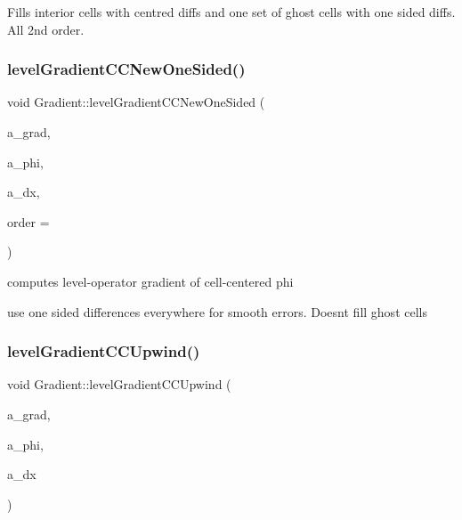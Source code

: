 Fills interior cells with centred diffs and one set of ghost cells with one sided diffs. All 2nd order. \mbox{\label{class_gradient_a00daa2aa0e66c5f70545cbd9cdf633a2}} 
\subsubsection{\texorpdfstring{level\+Gradient\+C\+C\+New\+One\+Sided()}{levelGradientCCNewOneSided()}}
{\footnotesize\ttfamily void Gradient\+::level\+Gradient\+C\+C\+New\+One\+Sided (\begin{DoxyParamCaption}\item[{\textbf{ Level\+Data}$<$ \textbf{ F\+Array\+Box} $>$ \&}]{a\+\_\+grad,  }\item[{const \textbf{ Level\+Data}$<$ \textbf{ F\+Array\+Box} $>$ \&}]{a\+\_\+phi,  }\item[{const \textbf{ Real}}]{a\+\_\+dx,  }\item[{int}]{order = {} }\end{DoxyParamCaption})\hspace{0.3cm}{\ttfamily [static]}}



computes level-\/operator gradient of cell-\/centered phi 

use one sided differences everywhere for smooth errors. Doesn\textquotesingle{}t fill ghost cells \mbox{\label{class_gradient_ab5fa9029705d216a3c1ae97b58bb970e}} 
\subsubsection{\texorpdfstring{level\+Gradient\+C\+C\+Upwind()}{levelGradientCCUpwind()}\hspace{0.1cm}{\footnotesize\ttfamily [1/2]}}
{\footnotesize\ttfamily void Gradient\+::level\+Gradient\+C\+C\+Upwind (\begin{DoxyParamCaption}\item[{\textbf{ Level\+Data}$<$ \textbf{ F\+Array\+Box} $>$ \&}]{a\+\_\+grad,  }\item[{const \textbf{ Level\+Data}$<$ \textbf{ F\+Array\+Box} $>$ \&}]{a\+\_\+phi,  }\item[{const \textbf{ Real}}]{a\+\_\+dx }\end{DoxyParamCaption})\hspace{0.3cm}{\ttfamily [static]}}



